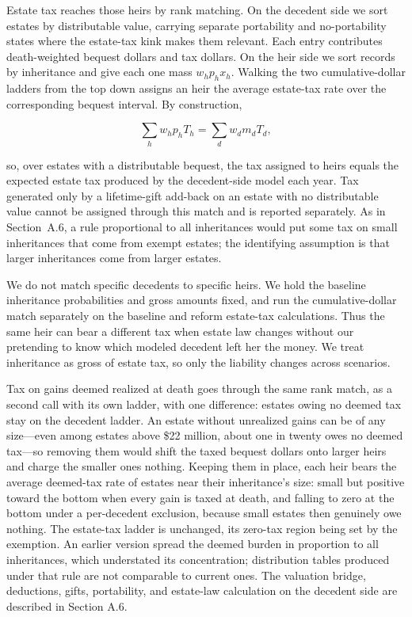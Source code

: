 \documentclass[10pt,twocolumn]{article}
\begin{document}
Estate tax reaches those heirs by rank matching. On the decedent side we
sort estates by distributable value, carrying separate portability and
no-portability states where the estate-tax kink makes them relevant.
Each entry contributes death-weighted bequest dollars and tax dollars.
On the heir side we sort records by inheritance and give each one mass
\(w_h p_h x_h\). Walking the two cumulative-dollar ladders from the top
down assigns an heir the average estate-tax rate over the corresponding
bequest interval. By construction,

\[
\sum_h w_h p_h T_h
= \sum_d w_d m_d T_d,
\]

so, over estates with a distributable bequest, the tax assigned to heirs
equals the expected estate tax produced by the decedent-side model each
year. Tax generated only by a lifetime-gift add-back on an estate with
no distributable value cannot be assigned through this match and is
reported separately. As in Section~A.6, a rule proportional to all inheritances would put some tax
on small inheritances that come from exempt estates; the identifying
assumption is that larger inheritances come from larger estates.

We do not match specific decedents to specific heirs. We hold the baseline inheritance
probabilities and gross amounts fixed, and run the cumulative-dollar
match separately on the baseline and reform estate-tax calculations.
Thus the same heir can bear a different tax when estate law changes
without our pretending to know which modeled decedent left her the
money. We treat inheritance as gross of estate tax, so only the
liability changes across scenarios.

Tax on gains deemed realized at death goes through the same rank match, as a
second call with its own ladder, with one difference: estates owing no deemed
tax stay on the decedent ladder. An estate without unrealized gains can be of
any size---even among estates above \$22 million, about one in twenty owes no
deemed tax---so removing them would shift the taxed bequest dollars onto
larger heirs and charge the smaller ones nothing. Keeping them in place, each
heir bears the average deemed-tax rate of estates near their inheritance's
size: small but positive toward the bottom when every gain is taxed at death,
and falling to zero at the bottom under a per-decedent exclusion, because
small estates then genuinely owe nothing. The estate-tax ladder is unchanged,
its zero-tax region being set by the exemption. An earlier version spread the
deemed burden in proportion to all inheritances, which understated its
concentration; distribution tables produced under that rule are not comparable
to current ones. The valuation bridge, deductions, gifts,
portability, and estate-law calculation on the decedent side are
described in Section A.6.
\end{document}
